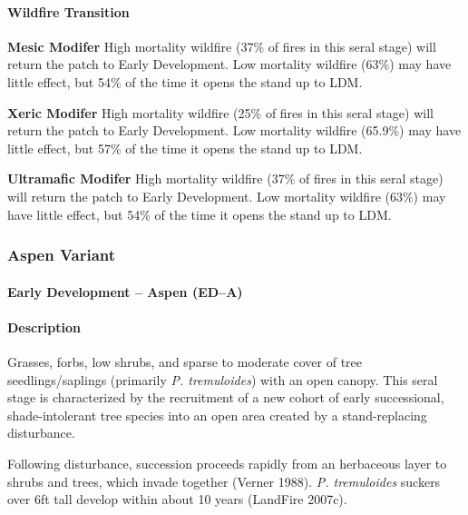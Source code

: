 \paragraph{Wildfire Transition}

\begin{adjustwidth}{2cm}{}
\textbf{Mesic Modifer } High mortality wildfire (37\% of fires in this seral stage) will return the patch to Early Development. Low mortality wildfire (63\%) may have little effect, but 54\% of the time it opens the stand up to LDM. 

\textbf{Xeric Modifer} High mortality wildfire (25\% of fires in this seral stage) will return the patch to Early Development. Low mortality wildfire (65.9\%) may have little effect, but 57\% of the time it opens the stand up to LDM. 

\textbf{Ultramafic Modifer} High mortality wildfire (37\% of fires in this seral stage) will return the patch to Early Development. Low mortality wildfire (63\%) may have little effect, but 54\% of the time it opens the stand up to LDM.

\end{adjustwidth}

\noindent\hrulefill
\noindent\hrulefill

\subsubsection{Aspen Variant}

\paragraph{Early Development – Aspen (ED–A)}

\paragraph{Description} Grasses, forbs, low shrubs, and sparse to moderate cover of tree seedlings/saplings (primarily \emph{P. tremuloides}) with an open canopy. This seral stage is characterized by the recruitment of a new cohort of early successional, shade-intolerant tree species into an open area created by a stand-replacing disturbance.

Following disturbance, succession proceeds rapidly from an herbaceous layer to shrubs and trees, which invade together (Verner 1988). \emph{P. tremuloides} suckers over 6ft tall develop within about 10 years (LandFire 2007c). 




